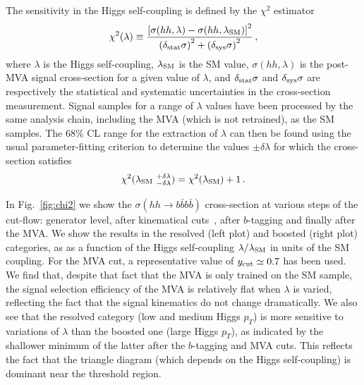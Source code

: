 \documentclass[a4paper,10pt]{article}
\newcommand{\be}{\begin{equation}}
\newcommand{\ee}{\end{equation}}
\newcommand{\lc}{\left[}
\newcommand{\rc}{\right]}
\newcommand{\lp}{\left(}
\newcommand{\rp}{\right)}
\begin{document}
  The sensitivity in the Higgs self-coupling is defined by the $\chi^2$ estimator
  \be
  \label{eq:chi2profile}
  \chi^2(\lambda) \equiv \frac{\lc \sigma(hh,\lambda) - \sigma(hh,\lambda_{\rm SM})
    \rc^2}{\lp \delta_{\rm stat}\sigma\rp^2+\lp \delta_{\rm sys}\sigma\rp^2 } \, ,
  \ee
  where $\lambda$ is the Higgs
  self-coupling, $\lambda_{\rm SM}$ is the SM value, $\sigma(hh,\lambda)$ is the
  post-MVA signal cross-section for a given value of $\lambda$, and $\delta_{\rm stat}\sigma$ and
  $\delta_{\rm sys}\sigma$ are respectively the statistical and systematic uncertainties in the cross-section
  measurement.
  Signal samples for a range of $\lambda$ values have been  processed
  by the same analysis chain, including the MVA (which is not
  retrained), as the SM samples.
  The 68\% CL range for the extraction of $\lambda$ can then be found using
  the usual parameter-fitting criterion to determine the values $\pm \delta\lambda$
  for which the cross-section satisfies
  \be
  \label{eq:condition}
\chi^2(\lambda_{\rm SM}~^{+\delta\lambda}_{-\delta\lambda})=\chi^2(\lambda_{\rm SM})+1 \, .
\ee
%

In Fig.~\ref{fig:chi2} we show the
 $\sigma(hh\to b\bar{b}b\bar{b})$ cross-section at
  various steps of the cut-flow: generator level, after
  kinematical cuts~\cite{Behr:2015oqq}, after $b$-tagging
  and finally after the MVA.
  We show the results
  in the resolved (left plot)
  and boosted (right plot) categories,
  as  as a function of the Higgs self-coupling
  $\lambda/\lambda_{\rm SM}$ in units of the SM coupling.
  For the MVA cut,  a representative value of $y_{\rm cut}\simeq 0.7$
  has been used.
  We find that, despite that fact that the MVA is only trained on the SM sample, the signal
  selection efficiency of the MVA is relatively flat when $\lambda$ is varied, reflecting the fact
  that the signal kinematics do not change dramatically.
  We also see that the resolved category (low and medium Higgs $p_T$) is more sensitive to variations of $\lambda$ than
  the boosted one (large Higgs $p_T$), as indicated by the shallower minimum of the latter after
  the $b$-tagging and MVA cuts.
  This reflects the fact that the triangle diagram (which depends on the Higgs self-coupling) is
  dominant near the threshold region.
 
\end{document}
